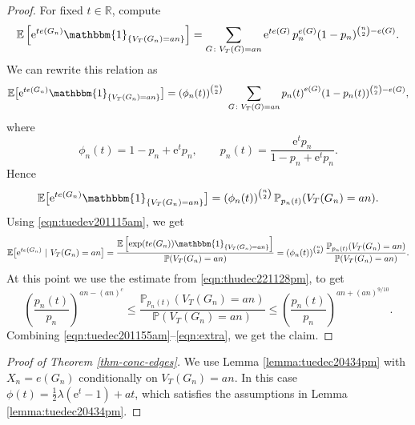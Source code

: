 \documentclass[bj,authoryear,noshowframe]{imsart}
\numberwithin{equation}{section}
\theoremstyle{plain}
\theoremstyle{definition}
\newcommand{\e}{{\mathrm e}}
\newcommand{\oneindic}{\mathbbm{1}}
\newcommand{\indic}[1]{\oneindic_{\{#1\}}}
\begin{document}
\begin{proof} 
For fixed $t \in \mathbb{R}$, compute 
	\begin{equation}
	\begin{aligned}
	\mathbb{E}\left[\e^{te(G_n)}\indic{V_T(G_n)=an}\right]
	= \sum_{G\colon V_T(G)=an} \e^{te(G)}\, p_n^{e(G)}(1-p_n)^{{n\choose 2}-e(G)}.
	\end{aligned}
	\end{equation}
We can rewrite this relation as 
	\begin{equation}
	\begin{aligned}
	\mathbb{E}\big[\e^{te(G_n)}\indic{V_T(G_n)=an}\big] = \left(\phi_n(t)\right)^{{n\choose 2}}\
	\sum_{G\colon V_T(G)=an}  {p_n(t)}^{e(G)}(1-p_n(t))^{{n\choose 2}-e(G)},
	\end{aligned}
	\end{equation}
where 
	\begin{equation}
	\phi_n(t) = 1-p_n+\e^tp_n, \qquad p_n(t)=\frac{\e^tp_n}{1-p_n+\e^tp_n}.
	\end{equation}
Hence
	\begin{equation}
	\label{eqn:tuedev201115am}
	\mathbb{E}\big[\e^{te(G_n)}\indic{V_T(G_n)=an}\big]
	= \left(\phi_n(t)\right)^{{n\choose 2}} \mathbb{P}_{p_n(t)}(V_T(G_n)=an).
	\end{equation}
Using \eqref{eqn:tuedev201115am}, we get
	\begin{equation}
	\label{eqn:tuedec201155am}
	\mathbb{E}\big[\e^{te(G_n)}~|~V_T(G_n)=an\big]
	= \frac{\mathbb{E}\left[\exp(te(G_n))\indic{V_T(G_n)=an}\right]}{\mathbb{P}(V_T(G_n)=an)} 
	= \left(\phi_n(t)\right)^{{n\choose 2}}\frac{\mathbb{P}_{p_n(t)}(V_T(G_n)=an)}{\mathbb{P}(V_T(G_n)=an)}.
	\end{equation}
At this point we use the estimate from \eqref{eqn:thudec221128pm}, to get
	\begin{equation}
	\label{eqn:extra}
	\left(\frac{p_n(t)}{p_n}\right)^{an-(an)^c}\leq \frac{\mathbb{P}_{p_n(t)}(V_T(G_n)=an)}{\mathbb{P}(V_T(G_n)=an)}
	\leq \left(\frac{p_n(t)}{p_n}\right)^{an+(an)^{9/10}}.
	\end{equation}
Combining \eqref{eqn:tuedec201155am}--\eqref{eqn:extra}, we get the claim.
\end{proof}

\begin{proof}[Proof of Theorem \ref{thm-conc-edges}]
We use Lemma \ref{lemma:tuedec20434pm} with $X_n = e(G_n)$ conditionally on $V_T(G_n)=an$. In this case $\phi(t)=\frac{1}{2}\lambda (\e^t-1)+at$, which satisfies the assumptions in Lemma \ref{lemma:tuedec20434pm}.
\end{proof}
\end{document}
